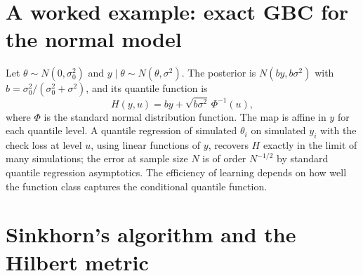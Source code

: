 \section{A worked example: exact GBC for the normal model}

Let $\theta\sim N(0,\sigma_0^2)$ and $y\mid\theta\sim N(\theta,\sigma^2)$. The posterior is $N(by,b\sigma^2)$ with $b = \sigma_0^2/(\sigma_0^2+\sigma^2)$, and its quantile function is
\[
H(y,u) = by+\sqrt{b\sigma^2}\,\Phi^{-1}(u),
\]
where $\Phi$ is the standard normal distribution function. The map is affine in $y$ for each quantile level. A quantile regression of simulated $\theta_i$ on simulated $y_i$ with the check loss at level $u$, using linear functions of $y$, recovers $H$ exactly in the limit of many simulations; the error at sample size $N$ is of order $N^{-1/2}$ by standard quantile regression asymptotics. The efficiency of learning depends on how well the function class captures the conditional quantile function.

\section{Sinkhorn's algorithm and the Hilbert metric}
\label{sec:sinkhorn_hilbert}

